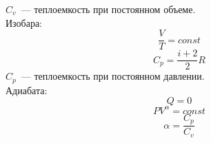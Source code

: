$C_v$~--- теплоемкость при постоянном объеме.\\
Изобара:
\begin{equation}
\frac{V}{T} = const
\end{equation}
\begin{equation}
C_p = \frac{i+2}{2}R
\end{equation}
$C_p$~--- теплоемкость при постоянном давлении.\\
Адиабата:
\begin{equation}
Q=0
\end{equation}
\begin{equation}
P V^\alpha = const
\end{equation}
\begin{equation}
\alpha = \frac{C_p}{C_v}
\end{equation}